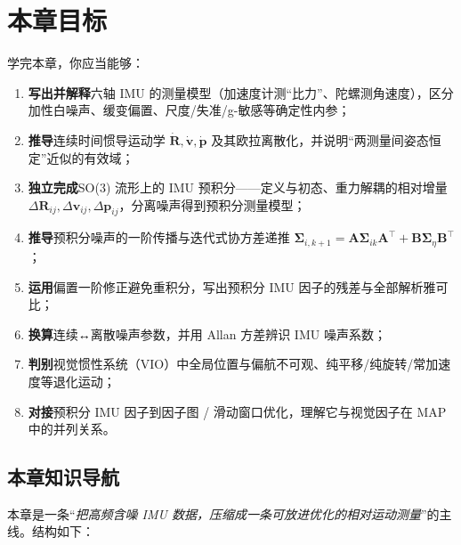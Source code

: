 \section*{本章目标}
学完本章，你应当能够：
\begin{enumerate}
  \item \textbf{写出并解释}六轴 IMU 的测量模型（加速度计测“比力”、陀螺测角速度），区分加性白噪声、缓变偏置、尺度/失准/g-敏感等确定性内参；
  \item \textbf{推导}连续时间惯导运动学 $\dot{\mathbf R},\dot{\mathbf v},\dot{\mathbf p}$ 及其欧拉离散化，并说明“两测量间姿态恒定”近似的有效域；
  \item \textbf{独立完成}SO(3) 流形上的 IMU 预积分——定义与初态、重力解耦的相对增量 $\Delta\mathbf R_{ij},\Delta\mathbf v_{ij},\Delta\mathbf p_{ij}$，分离噪声得到预积分测量模型；
  \item \textbf{推导}预积分噪声的一阶传播与迭代式协方差递推 $\boldsymbol\Sigma_{i,k+1}=\mathbf A\boldsymbol\Sigma_{ik}\mathbf A^\top+\mathbf B\boldsymbol\Sigma_\eta\mathbf B^\top$；
  \item \textbf{运用}偏置一阶修正避免重积分，写出预积分 IMU 因子的残差与全部解析雅可比；
  \item \textbf{换算}连续↔离散噪声参数，并用 Allan 方差辨识 IMU 噪声系数；
  \item \textbf{判别}视觉惯性系统（VIO）中全局位置与偏航不可观、纯平移/纯旋转/常加速度等退化运动；
  \item \textbf{对接}预积分 IMU 因子到因子图 / 滑动窗口优化，理解它与视觉因子在 MAP 中的并列关系。
\end{enumerate}

\subsection*{本章知识导航}
本章是一条“\emph{把高频含噪 IMU 数据，压缩成一条可放进优化的相对运动测量}”的主线。结构如下：

